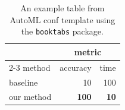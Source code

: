\begin{table}
  \caption{An example table from AutoML conf template using the \texttt{booktabs} package.}
  \label{example_table}
  \centering
  \begin{tabular}{lrr}
    \toprule
    & \multicolumn{2}{c}{metric} \\
    \cmidrule{2-3}
    method & accuracy & time \\
    \midrule
    baseline & 10 & 100 \\
    our method & \textbf{100} & \textbf{10} \\
    \bottomrule
  \end{tabular}
\end{table}